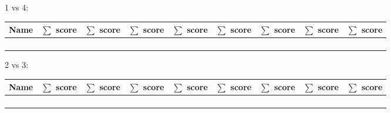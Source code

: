 \documentclass{article}
\begin{document}
\begin{center}
    1 vs 4: 
    \begin{tabular}{r|c|c|c|c|c|c|c|c}
        \toprule
        Name      & \(\sum\) score & \(\sum\) score & \(\sum\) score & \(\sum\) score & \(\sum\) score & \(\sum\) score & \(\sum\) score & \(\sum\) score\\
        \midrule
                  &                &                &                &                &                &                &                & \\
                  &                &                &                &                &                &                &                & \\
        \midrule
                  &                &                &                &                &                &                &                & \\
                  &                &                &                &                &                &                &                & \\
        \bottomrule
    \end{tabular}
\end{center}

\begin{center}
    2 vs 3: 
    \begin{tabular}{r|c|c|c|c|c|c|c|c}
        \toprule
        Name      & \(\sum\) score & \(\sum\) score & \(\sum\) score & \(\sum\) score & \(\sum\) score & \(\sum\) score & \(\sum\) score & \(\sum\) score\\
        \midrule
                  &                &                &                &                &                &                &                & \\
                  &                &                &                &                &                &                &                & \\
        \midrule
                  &                &                &                &                &                &                &                & \\
                  &                &                &                &                &                &                &                & \\
        \bottomrule
    \end{tabular}
\end{center}
\end{document}

